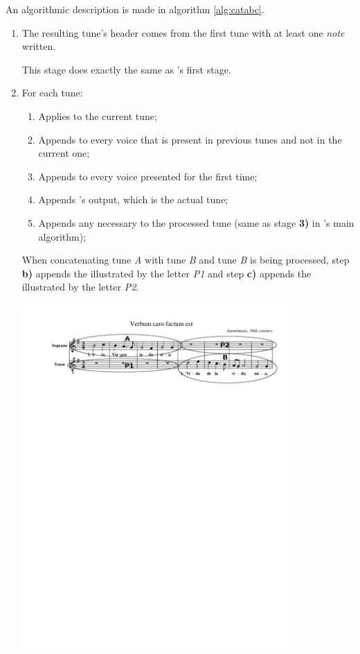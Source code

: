 An algorithmic description is made in algorithm \ref{alg:catabc}.

\begin{enumerate}
  \item The resulting tune's header comes from the first tune with at least one \emph{note} written.

  This stage does exactly the same as \pasteabc{}'s first stage.

  \item For each tune:

  \begin{enumerate}
    \item Applies \dt{} to the current tune;
    \item Appends \measurerests{} to every voice that is present in previous tunes and not in the current one;
    \item Appends \measurerests{} to every voice presented for the first time;
    \item Appends \dt{}'s output, which is the actual tune;
    \item Appends any necessary \measurerests{} to the processed tune (same as stage \textbf{3)} in
    \pasteabc{}'s main algorithm);
  \end{enumerate}

  \begin{program}
    When concatenating tune \emph{A} with tune \emph{B} and tune \emph{B} is being processed, step
    \textbf{b)} appends the \measurerests{} illustrated by the letter \emph{P1} and step \textbf{c)}
    appends the \measurerests{} illustrated by the letter \emph{P2}.

    \begin{center}
      \includegraphics[width=0.8\textwidth, clip=true, trim = 15mm 213mm 0mm 10mm]{img/verbum_measures.pdf}
    \end{center}


\end{program}
\end{enumerate}
